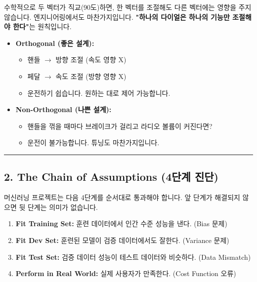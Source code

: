 \documentclass[11pt,a4paper]{book}
\theoremstyle{definition}
\begin{document}
수학적으로 두 벡터가 직교(90도)하면, 한 벡터를 조절해도 다른 벡터에는 영향을 주지 않습니다. 엔지니어링에서도 마찬가지입니다. \textbf{"하나의 다이얼은 하나의 기능만 조절해야 한다"}는 원칙입니다.

\begin{analogybox}[title={자동차 운전 비유}]
\begin{itemize}
    \item \textbf{Orthogonal (좋은 설계):}
    \begin{itemize}
        \item 핸들 $\rightarrow$ 방향 조절 (속도 영향 X)
        \item 페달 $\rightarrow$ 속도 조절 (방향 영향 X)
        \item 운전하기 쉽습니다. 원하는 대로 제어 가능합니다.
    \end{itemize}
    \item \textbf{Non-Orthogonal (나쁜 설계):}
    \begin{itemize}
        \item 핸들을 꺾을 때마다 브레이크가 걸리고 라디오 볼륨이 커진다면?
        \item 운전이 불가능합니다. 튜닝도 마찬가지입니다.
    \end{itemize}
\end{itemize}
\end{analogybox}

\vspace{0.5cm}\hrule\vspace{0.5cm}

\subsection{2. The Chain of Assumptions (4단계 진단)}
머신러닝 프로젝트는 다음 4단계를 순서대로 통과해야 합니다. 앞 단계가 해결되지 않으면 뒷 단계는 의미가 없습니다.

\begin{enumerate}
    \item \textbf{Fit Training Set:} 훈련 데이터에서 인간 수준 성능을 낸다. (Bias 문제)
    \item \textbf{Fit Dev Set:} 훈련된 모델이 검증 데이터에서도 잘한다. (Variance 문제)
    \item \textbf{Fit Test Set:} 검증 데이터 성능이 테스트 데이터와 비슷하다. (Data Mismatch)
    \item \textbf{Perform in Real World:} 실제 사용자가 만족한다. (Cost Function 오류)
\end{enumerate}
\end{document}
